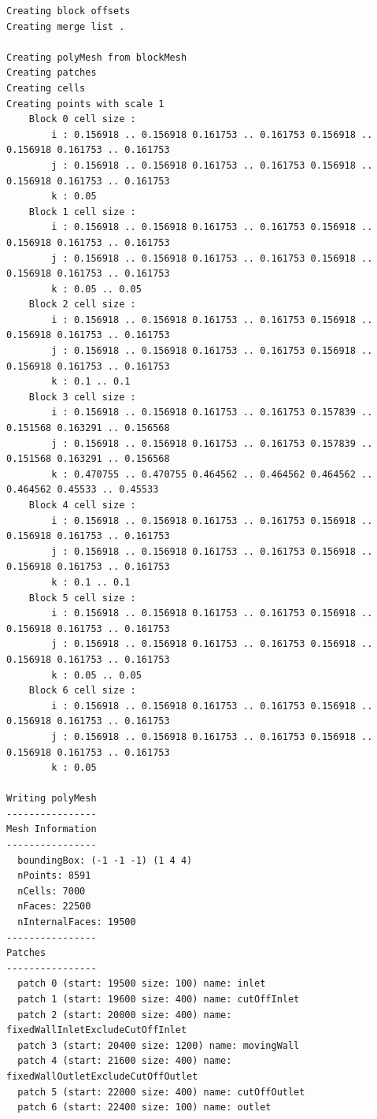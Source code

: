 \documentclass[onsided]{book}
\numberwithin{equation}{section}
\begin{document}
\begin{enumerate}
\begin{verbatim}
Creating block offsets
Creating merge list .

Creating polyMesh from blockMesh
Creating patches
Creating cells
Creating points with scale 1
    Block 0 cell size :
        i : 0.156918 .. 0.156918 0.161753 .. 0.161753 0.156918 .. 0.156918 0.161753 .. 0.161753 
        j : 0.156918 .. 0.156918 0.161753 .. 0.161753 0.156918 .. 0.156918 0.161753 .. 0.161753 
        k : 0.05
    Block 1 cell size :
        i : 0.156918 .. 0.156918 0.161753 .. 0.161753 0.156918 .. 0.156918 0.161753 .. 0.161753 
        j : 0.156918 .. 0.156918 0.161753 .. 0.161753 0.156918 .. 0.156918 0.161753 .. 0.161753 
        k : 0.05 .. 0.05
    Block 2 cell size :
        i : 0.156918 .. 0.156918 0.161753 .. 0.161753 0.156918 .. 0.156918 0.161753 .. 0.161753 
        j : 0.156918 .. 0.156918 0.161753 .. 0.161753 0.156918 .. 0.156918 0.161753 .. 0.161753 
        k : 0.1 .. 0.1
    Block 3 cell size :
        i : 0.156918 .. 0.156918 0.161753 .. 0.161753 0.157839 .. 0.151568 0.163291 .. 0.156568 
        j : 0.156918 .. 0.156918 0.161753 .. 0.161753 0.157839 .. 0.151568 0.163291 .. 0.156568 
        k : 0.470755 .. 0.470755 0.464562 .. 0.464562 0.464562 .. 0.464562 0.45533 .. 0.45533 
    Block 4 cell size :
        i : 0.156918 .. 0.156918 0.161753 .. 0.161753 0.156918 .. 0.156918 0.161753 .. 0.161753 
        j : 0.156918 .. 0.156918 0.161753 .. 0.161753 0.156918 .. 0.156918 0.161753 .. 0.161753 
        k : 0.1 .. 0.1
    Block 5 cell size :
        i : 0.156918 .. 0.156918 0.161753 .. 0.161753 0.156918 .. 0.156918 0.161753 .. 0.161753 
        j : 0.156918 .. 0.156918 0.161753 .. 0.161753 0.156918 .. 0.156918 0.161753 .. 0.161753 
        k : 0.05 .. 0.05
    Block 6 cell size :
        i : 0.156918 .. 0.156918 0.161753 .. 0.161753 0.156918 .. 0.156918 0.161753 .. 0.161753 
        j : 0.156918 .. 0.156918 0.161753 .. 0.161753 0.156918 .. 0.156918 0.161753 .. 0.161753 
        k : 0.05

Writing polyMesh
----------------
Mesh Information
----------------
  boundingBox: (-1 -1 -1) (1 4 4)
  nPoints: 8591
  nCells: 7000
  nFaces: 22500
  nInternalFaces: 19500
----------------
Patches
----------------
  patch 0 (start: 19500 size: 100) name: inlet
  patch 1 (start: 19600 size: 400) name: cutOffInlet
  patch 2 (start: 20000 size: 400) name: fixedWallInletExcludeCutOffInlet
  patch 3 (start: 20400 size: 1200) name: movingWall
  patch 4 (start: 21600 size: 400) name: fixedWallOutletExcludeCutOffOutlet
  patch 5 (start: 22000 size: 400) name: cutOffOutlet
  patch 6 (start: 22400 size: 100) name: outlet


\end{verbatim}
\end{enumerate}
\end{document}
